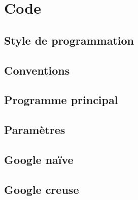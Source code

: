 \section{Code}

\subsection{Style de programmation}


\subsection{Conventions}


\subsection{Programme principal}


\subsection{Paramètres}


\subsection{Google naïve}


\subsection{Google creuse}
